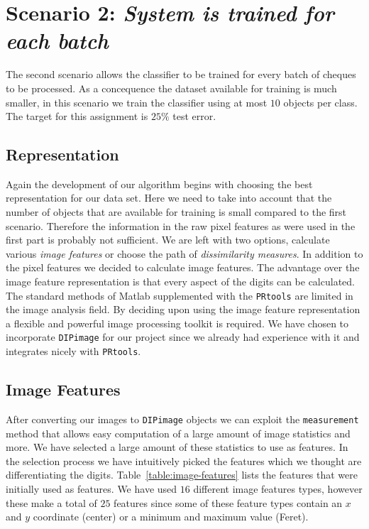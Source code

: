 \documentclass{article}
\begin{document}
\section{Scenario 2: \textit{System is trained for each batch}}

The second scenario allows the classifier to be trained for every batch of cheques to be processed. As a concequence the dataset available for training is much smaller, in this scenario we train the classifier using at most $10$ objects per class. The target for this assignment is $25\%$ test error.

\subsection{Representation}
Again the development of our algorithm begins with choosing the best representation for our data set. Here we need to take into account that the number of objects that are available for training is small compared to the first scenario. Therefore the information in the raw pixel features as were used in the first part is probably not sufficient. We are left with two options, calculate various \emph{image features} or choose the path of \emph{dissimilarity measures}. In addition to the pixel features we decided to calculate image features. The advantage over the image feature representation is that every aspect of the digits can be calculated. \\

The standard methods of Matlab supplemented with the \texttt{PRtools} are limited in the image analysis field. By deciding upon using the image feature representation a flexible and powerful image processing toolkit is required. We have chosen to incorporate \texttt{DIPimage} for our project since we already had experience with it and integrates nicely with \texttt{PRtools}.

\subsection{Image Features}

After converting our images to \texttt{DIPimage} objects we can exploit the \texttt{measurement} method that allows easy computation of a large amount of image statistics and more. We have selected a large amount of these statistics to use as features. In the selection process we have intuitively picked the features which we thought are differentiating the digits. Table~\ref{table:image-features} lists the features that were initially used as features. We have used $16$ different image features types, however these make a total of $25$ features since some of these feature types contain an $x$ and $y$ coordinate (center) or a minimum and maximum value (Feret).
\end{document}

